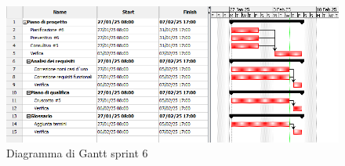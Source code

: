         \begin{figure}[h!]
            \centering
            \includegraphics[scale = 0.6]{template/images/gantt6.png}
            \caption{Diagramma di Gantt sprint 6}
            \label{fig:3.5} %
        \end{figure}

 
